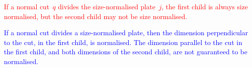 \documentclass[ppgc,tese,english,formais,babel]{iiufrgs}
\newif\iffinalversion
\newcommand{\newtext}[1]{\iffinalversion%
#1%
\else%
\textcolor{blue}{#1}%
\fi%
}
\newcommand{\oldtext}[1]{\iffinalversion%
\else%
\textcolor{red}{#1}%
\fi%
}
\begin{document}
\begin{remark}
\oldtext{If a normal cut~\(q\) divides the size-normalised plate~\(j\), the first child is always size normalised, but the second child may not be size normalised.}
\newtext{If a normal cut divides a size-normalised plate, then the dimension perpendicular to the cut, in the first child, is normalised. The dimension parallel to the cut in the first child, and both dimensions of the second child, are not guaranteed to be normalised.}
\end{remark}







\end{document}
